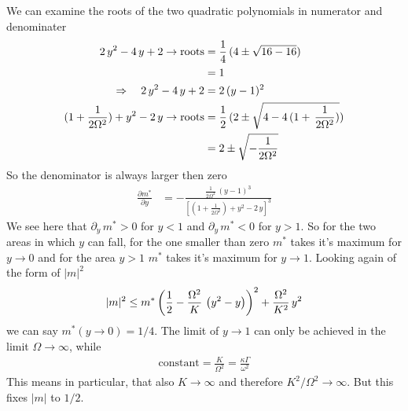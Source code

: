 \documentclass{article}
\begin{document}
We can examine the roots of the two quadratic polynomials in numerator and denominater
\begin{align*}
    2\,{y}^2-4\,{y}+2\rightarrow\text{roots}&=\frac{1}{4}\,(4\pm\sqrt{16-16})\\
    &=1\\
    \Rightarrow\quad 2\,{y}^2-4\,{y}+2&=2\,({y}-1)^2\\
    (1+\frac{1}{2\Omega^2})+{y}^2-2\,{y}\rightarrow\text{roots}&=\frac{1}{2}\,(2\pm\sqrt{4-4\,(1+\,\frac{1}{2\Omega^2})})\\
    &=2\pm\sqrt{-\frac{1}{2\Omega^2}}
\end{align*}
So the denominator is always larger then zero
\begin{align*}
    \frac{\partial m^*}{\partial{y}}&=-\frac{\frac{1}{2\Omega^2}\,({y}-1)^3}{\left[(1+\frac{1}{2\Omega^2})+{y}^2-2\,{y}\right]^3}
\end{align*}
We see here that $\partial_{{y}}\,m^*>0$ for ${y}<1$ and $\partial_{{y}}\,m^*<0$ for ${y}>1$. So for the two areas in which ${y}$ can fall, for the one smaller than zero $m^*$ takes it's maximum for ${y}\rightarrow0$ and for the area ${y}>1$ $m^*$ takes it's maximum for ${y}\rightarrow1$. Looking again of the form of $|m|^2$ 
\begin{align*}
    |m|^2\leq m^*\left( \frac{1}{2}-\frac{\Omega^2}{K}\,\left( {y}^2- {y} \right) \right)^2+\frac{\Omega^2}{K^2}\,{y}^2
\end{align*}
we can say $m^*({y}\rightarrow0)=1/4$. The limit of ${y}\rightarrow1$ can only be achieved in the limit $\Omega\rightarrow\infty$, while%
\begin{align*}
    \text{constant}=\frac{K}{\Omega^2}=\frac{\kappa\Gamma}{\omega^2}
\end{align*}
This means in particular, that also $K\rightarrow\infty$ and therefore $K^2/\Omega^2\rightarrow\infty$. But this fixes $|m|$ to $1/2$. 
\end{document}
